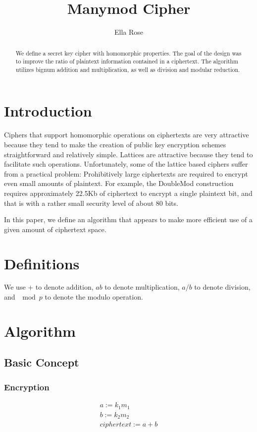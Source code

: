 \documentclass[preprint]{iacrtrans}
\author{Ella Rose\inst{1}}
\institute{Paso Robles, CA\email{python_pride@protonmail.com}}
\title[Manymod Cipher]{Manymod Cipher}
\begin{document}
\maketitle


\begin{abstract}
 We define a secret key cipher with homomorphic properties. The goal of the design was to improve the ratio of plaintext information contained in a ciphertext. The algorithm utilizes bignum addition and multiplication, as well as division and modular reduction. 
\end{abstract}

\todototoc
\listoftodos

\section{Introduction}
 Ciphers that support homomorphic operations on ciphertexts are very attractive because they tend to make the creation of public key encryption schemes straightforward and relatively simple. Lattices are attractive because they tend to facilitate such operations. Unfortunately, some of the lattice based ciphers suffer from a practical problem: Prohibitively large ciphertexts are required to encrypt even small amounts of plaintext. For example, the DoubleMod construction requires approximately 22.5Kb of ciphertext to encrypt a single plaintext bit, and that is with a rather small security level of about 80 bits.

In this paper, we define an algorithm that appears to make more efficient use of a given amount of ciphertext space. 

\section{Definitions}
We use $+$ to denote addition, $ab$ to denote multiplication, $a / b$ to denote division, and $\mod p$ to denote the modulo operation. 

\section{Algorithm}
\subsection{Basic Concept}
\subsubsection{Encryption}
\begin{align}
a := k_1 m_1\\
b := k_2 m_2\\
ciphertext  := a + b
\end{align}
\end{document}
